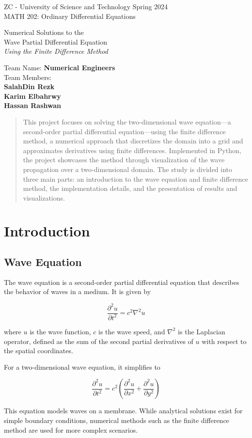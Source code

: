 \documentclass{article}
\renewcommand{\maketitle}{
  \begin{flushleft}
    ZC - University of Science and Technology
    \hfill Spring 2024 \\
    MATH 202: Ordinary Differential Equations
  \end{flushleft}
  \begin{center}
    \Huge Numerical Solutions to the \\Wave Partial Differential Equation \\
    \LARGE \textit{Using the Finite Difference Method}
  \end{center}
  \begin{flushleft}
    Team Name: \textbf{Numerical Engineers} \\
    Team Members: \\
    \hspace{1em} \textbf{SalahDin Rezk} \\
    \hspace{1em} \textbf{Karim Elbahrwy} \\
    \hspace{1em} \textbf{Hassan Rashwan} \\
  \end{flushleft}
}
\begin{document}
\maketitle
\tableofcontents
\listoffigures
\lstlistoflistings

\newpage

\begin{abstract}
  This project focuses on solving the two-dimensional wave equation---a second-order partial differential equation---using the finite difference method, a numerical approach that discretizes the domain into a grid and approximates derivatives using finite differences. Implemented in Python, the project showcases the method through visualization of the wave propagation over a two-dimensional domain. The study is divided into three main parts: an introduction to the wave equation and finite difference method, the implementation details, and the presentation of results and visualizations.
\end{abstract}

\section{Introduction}

\subsection{Wave Equation}

The wave equation is a second-order partial differential equation that describes the behavior of waves in a medium. It is given by

\begin{equation}
  \frac{\partial^2 u}{\partial t^2} = c^2 \nabla^2 u
\end{equation}

where \(u\) is the wave function, \(c\) is the wave speed, and \(\nabla^2\) is the Laplacian operator, defined as the sum of the second partial derivatives of \(u\) with respect to the spatial coordinates. \cite{zill2017diff}

For a two-dimensional wave equation, it simplifies to

\begin{equation}
  \frac{\partial^2 u}{\partial t^2} = c^2 \left( \frac{\partial^2 u}{\partial x^2} + \frac{\partial^2 u}{\partial y^2} \right)
\end{equation}

This equation models waves on a membrane. While analytical solutions exist for simple boundary conditions, numerical methods such as the finite difference method are used for more complex scenarios.
\end{document}
